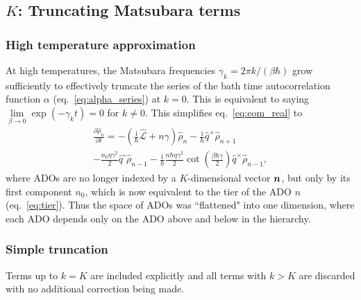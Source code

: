 \subsection{$K$: Truncating Matsubara terms}\label{subsec:K_truncation}
\subsubsection{High temperature approximation}
At high temperatures, the Matsubara frequencies $\gamma_k = 2\pi k/(\beta\hbar)$ grow sufficiently to effectively truncate the series of the bath time autocorrelation function $\alpha$ (eq.~\ref{eq:alpha_series}) at $k=0$. This is equivalent to saying $\lim\limits_{\beta \to 0}\exp(-\gamma_{k} t) = 0$ for $k\neq 0$. This simplifies eq.~\ref{eq:eom_real} to
\begin{multline}
\frac{\partial \hat{\rho}_{n} }{\partial t} =
-\left(\frac{\mathrm{i}}{\hbar}\hat{\mathcal{L}}+n \gamma \right)\hat{\rho}_{n}
-\frac{\mathrm{i}}{\hbar}\hat{q}^\times \hat{\rho}_{n +1} \\
-\frac{n_0 \eta\gamma^2}{2}\hat{q}^\circ\hat{\rho}_{n -1}
-\frac{\mathrm{i}}{\hbar}\frac{n \hbar \eta \gamma^2}{2}\cot\left(\frac{\beta\hbar\gamma}{2}\right)\hat{q}^\times\hat{\rho}_{n -1},
\label{eq:qheom_high_temp}
\end{multline}
where ADOs are no longer indexed by a $K$-dimensional vector $\bm{n}$, but only by its first component $n_0$, which is now equivalent to the tier of the ADO $n$ (eq.~\ref{eq:tier}). Thus the space of ADOs was ``flattened" into one dimension, where each ADO depends only on the ADO above and below in the hierarchy.
\subsubsection{Simple truncation}
Terms up to $k=K$ are included explicitly and all terms with $k>K$ are discarded with no additional correction being made.
